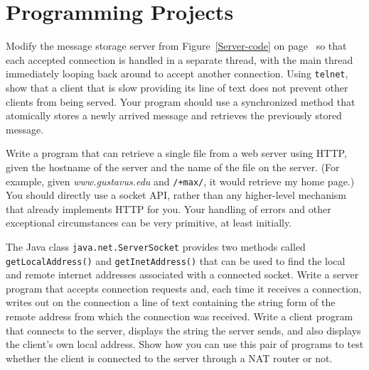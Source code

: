 \section*{Programming Projects}

\begin{chapterEnumerate}
\item
\label{multithreaded-server-project}
Modify the message storage server from Figure~\ref{Server-code} on
page~\pageref{Server-code} so
that each accepted connection is handled in a separate thread, with
the main thread immediately looping back around to accept another
connection.  Using \verb|telnet|, show that a client that is slow
providing its line of text does not prevent other clients from being
served.  Your program should use a synchronized method that atomically stores a
newly arrived message and retrieves the previously stored message.
\item
Write a program that can retrieve a single file from a web server
using HTTP, given the hostname of the server and the name of the
file on the server. (For example, given \textit{www.gustavus.edu} and
\verb|/+max/|, it would retrieve my home page.)  You should directly
use a socket API, rather than any higher-level mechanism that already
implements HTTP for you.  Your handling of errors and other
exceptional circumstances can be very primitive, at least initially.
\item
The Java class {\tt java.net.ServerSocket} provides two methods called {\tt
  getLocalAddress()} and {\tt getInetAddress()} that can be used to
  find the local and remote internet addresses associated with a
  connected socket.  Write a server program that accepts connection
  requests and, each time it receives a connection, writes out on the
  connection a line of text containing the string form of the remote
  address from which the connection was received.  Write a client
  program that connects to the server, displays the string the server
  sends, and also displays the client's own local address.  Show how
  you can use this pair of programs to test whether the client is
  connected to the server through a NAT router or not.
\end{chapterEnumerate}

